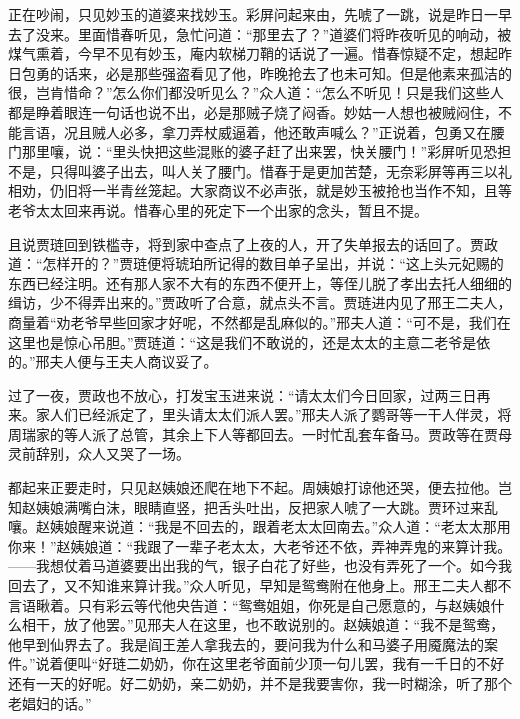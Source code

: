 \begin{parag}
    正在吵闹，只见妙玉的道婆来找妙玉。彩屏问起来由，先唬了一跳，说是昨日一早去了没来。里面惜春听见，急忙问道：“那里去了？”道婆们将昨夜听见的响动，被煤气熏着，今早不见有妙玉，庵内软梯刀鞘的话说了一遍。惜春惊疑不定，想起昨日包勇的话来，必是那些强盗看见了他，昨晚抢去了也未可知。但是他素来孤洁的很，岂肯惜命？”怎么你们都没听见么？”众人道：“怎么不听见！只是我们这些人都是睁着眼连一句话也说不出，必是那贼子烧了闷香。妙姑一人想也被贼闷住，不能言语，况且贼人必多，拿刀弄杖威逼着，他还敢声喊么？”正说着，包勇又在腰门那里嚷，说：“里头快把这些混账的婆子赶了出来罢，快关腰门！”彩屏听见恐担不是，只得叫婆子出去，叫人关了腰门。惜春于是更加苦楚，无奈彩屏等再三以礼相劝，仍旧将一半青丝笼起。大家商议不必声张，就是妙玉被抢也当作不知，且等老爷太太回来再说。惜春心里的死定下一个出家的念头，暂且不提。
\end{parag}


\begin{parag}
    且说贾琏回到铁槛寺，将到家中查点了上夜的人，开了失单报去的话回了。贾政道：“怎样开的？”贾琏便将琥珀所记得的数目单子呈出，并说：“这上头元妃赐的东西已经注明。还有那人家不大有的东西不便开上，等侄儿脱了孝出去托人细细的缉访，少不得弄出来的。”贾政听了合意，就点头不言。贾琏进内见了邢王二夫人，商量着“劝老爷早些回家才好呢，不然都是乱麻似的。”邢夫人道：“可不是，我们在这里也是惊心吊胆。”贾琏道：“这是我们不敢说的，还是太太的主意二老爷是依的。”邢夫人便与王夫人商议妥了。
\end{parag}


\begin{parag}
    过了一夜，贾政也不放心，打发宝玉进来说：“请太太们今日回家，过两三日再来。家人们已经派定了，里头请太太们派人罢。”邢夫人派了鹦哥等一干人伴灵，将周瑞家的等人派了总管，其余上下人等都回去。一时忙乱套车备马。贾政等在贾母灵前辞别，众人又哭了一场。
\end{parag}


\begin{parag}
    都起来正要走时，只见赵姨娘还爬在地下不起。周姨娘打谅他还哭，便去拉他。岂知赵姨娘满嘴白沫，眼睛直竖，把舌头吐出，反把家人唬了一大跳。贾环过来乱嚷。赵姨娘醒来说道：“我是不回去的，跟着老太太回南去。”众人道：“老太太那用你来！”赵姨娘道：“我跟了一辈子老太太，大老爷还不依，弄神弄鬼的来算计我。——我想仗着马道婆要出出我的气，银子白花了好些，也没有弄死了一个。如今我回去了，又不知谁来算计我。”众人听见，早知是鸳鸯附在他身上。邢王二夫人都不言语瞅着。只有彩云等代他央告道：“鸳鸯姐姐，你死是自己愿意的，与赵姨娘什么相干，放了他罢。”见邢夫人在这里，也不敢说别的。赵姨娘道：“我不是鸳鸯，他早到仙界去了。我是阎王差人拿我去的，要问我为什么和马婆子用魇魔法的案件。”说着便叫“好琏二奶奶，你在这里老爷面前少顶一句儿罢，我有一千日的不好还有一天的好呢。好二奶奶，亲二奶奶，并不是我要害你，我一时糊涂，听了那个老娼妇的话。”
\end{parag}


